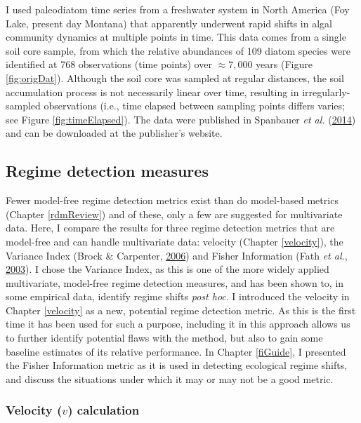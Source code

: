 \documentclass[12pt,twoside,openany]{reedthesis}
\begin{document}
I used paleodiatom time series from a freshwater system in North America (Foy Lake, present day Montana) that apparently underwent rapid shifts in algal community dynamics at multiple points in time. This data comes from a single soil core sample, from which the relative abundances of 109 diatom species were identified at 768 observations (time points) over \(\approx7,000\) years (Figure \ref{fig:origDat}). Although the soil core was sampled at regular distances, the soil accumulation process is not necessarily linear over time, resulting in irregularly-sampled observations (i.e., time elapsed between sampling points differs varies; see Figure \ref{fig:timeElapsed}). The data were published in Spanbauer \emph{et al.} (\protect\hyperlink{ref-spanbauer_prolonged_2014}{2014}) and can be downloaded at the publisher's website.

\hypertarget{regime-detection-measures}{%
\subsection{Regime detection measures}\label{regime-detection-measures}}

Fewer model-free regime detection metrics exist than do model-based metrics (Chapter \ref{rdmReview}) and of these, only a few are suggested for multivariate data. Here, I compare the results for three regime detection metrics that are model-free and can handle multivariate data: velocity (Chapter \ref{velocity}), the Variance Index (Brock \& Carpenter, \protect\hyperlink{ref-brock_variance_2006}{2006}) and Fisher Information (Fath \emph{et al.}, \protect\hyperlink{ref-fath_regime_2003}{2003}). I chose the Variance Index, as this is one of the more widely applied multivariate, model-free regime detection measures, and has been shown to, in some empirical data, identify regime shifts \emph{post hoc}. I introduced the velocity in Chapter \ref{velocity} as a new, potential regime detection metric. As this is the first time it has been used for such a purpose, including it in this approach allows us to further identify potential flaws with the method, but also to gain some baseline estimates of its relative performance. In Chapter \ref{fiGuide}, I presented the Fisher Information metric as it is used in detecting ecological regime shifts, and discuss the situations under which it may or may not be a good metric.

\hypertarget{velocity-v-calculation}{%
\subsubsection{\texorpdfstring{Velocity (\(v\)) calculation}{Velocity (v) calculation}}\label{velocity-v-calculation}}
\end{document}
